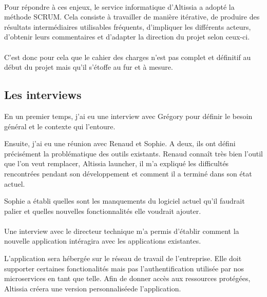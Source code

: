 \paragraph{}
Pour répondre à ces enjeux, le service informatique d'Altissia a adopté la méthode SCRUM.
Cela consiste à travailler de manière itérative, de produire des résultats intermédiaires utilisables fréquents, d'impliquer les différents acteurs, d'obtenir leurs commentaires et d'adapter la direction du projet selon ceux-ci.

\paragraph{}
C'est donc pour cela que le cahier des charges n'est pas complet et définitif au début du projet mais qu'il s'étoffe au fur et à mesure.

\subsection{Les interviews}
\label{subsec:interviews}

    En un premier temps, j'ai eu une interview avec Grégory pour définir le besoin général et le contexte qui l'entoure. 
    
    Ensuite, j'ai eu une réunion avec Renaud et Sophie.
    A deux, ils ont défini précisément la problématique des outils existants.
    Renaud connaît très bien l'outil que l'on veut remplacer, Altissia launcher, il m'a expliqué les difficultés rencontrées pendant son développement et comment il a terminé dans son état actuel.
    
    Sophie a établi quelles sont les manquements du logiciel actuel qu'il faudrait palier et quelles nouvelles fonctionnalités elle voudrait ajouter.

    \paragraph{}
    Une interview avec le directeur technique m'a permis d'établir comment la nouvelle application intéragira avec les applications existantes.

    L'application sera hébergée sur le réseau de travail de l'entreprise.
    Elle doit supporter certaines fonctionalités mais pas l'authentification utilisée par nos microservices en tant que telle.
    Afin de donner accès aux ressources protégées, Altissia créera une version personnalisée\footnotemark de l'application.

